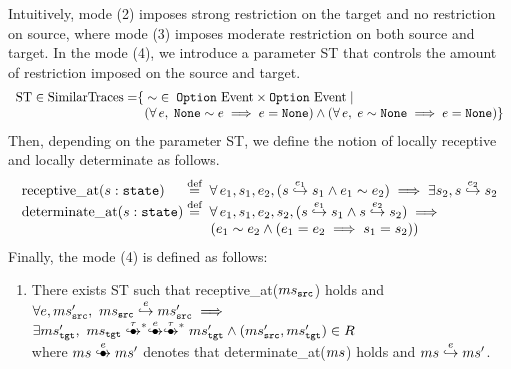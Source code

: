 Intuitively, mode (2) imposes strong restriction on the target and no restriction on source, where mode (3) imposes moderate restriction on both source and target.
In the mode (4), we introduce a parameter ST that controls the amount of restriction imposed on the source and target.
\[
\begin{array}{l@{}l}
\textrm{ST} \in \textrm{SimilarTraces} = & \{\; \sim \; \in \; \option \Events \times \option \Events \;|\; \\
                         & \;\; (\forall \, e, \; \none \sim e \implies e = \none) \land (\forall \, e, \; e \sim \none \implies e = \none) \}
\end{array}
\]
Then, depending on the parameter ST, we define the notion of locally receptive and locally determinate as follows.
\[
\begin{array}{l@{}l}
\textrm{receptive\_at} (s: \texttt{state})   & \; \defeq \; \forall \, e_1, s_1, e_2, (s \estep{e_1} s_1 \land e_1 \sim e_2) \implies \exists s_2, s \estep{e_2} s_2 \\
\textrm{determinate\_at} (s: \texttt{state}) & \; \defeq \; \forall \, e_1, s_1, e_2, s_2, (s \estep{e_1} s_1 \land s \estep{e_2} s_2) \implies \\
                                             & \;\;\;\;\;\;\; (e_1 \sim e_2 \land (e_1 = e_2 \implies s_1 = s_2)) \\
\end{array}
\]
Finally, the mode (4) is defined as follows:
\begin{enumerate}[resume]
\item There exists ST such that receptive\_at($ms{}_{\texttt{src}{}}$) holds and\\
  $\forall e, ms{}_{\texttt{src}{}}',~ ms{}_{\texttt{src}{}} \stackrel{e}{\hookrightarrow} ms{}_{\texttt{src}{}}' \implies {} $ \\
  $ \exists \mstgt',~ \mstgt \exstep{\tau}^{\raisebox{-1mm}{\scriptsize$\ast$}} \exstep{e}\exstep{\tau}^{\raisebox{-1mm}{\scriptsize$\ast$}} \mstgt' \land (\mssrc', \mstgt') \in R$\\
  where $\ms \exstep{e} \ms'$ denotes that determinate\_at($ms$) holds and $ms \stackrel{e}{\hookrightarrow} ms'$.
\end{enumerate}
